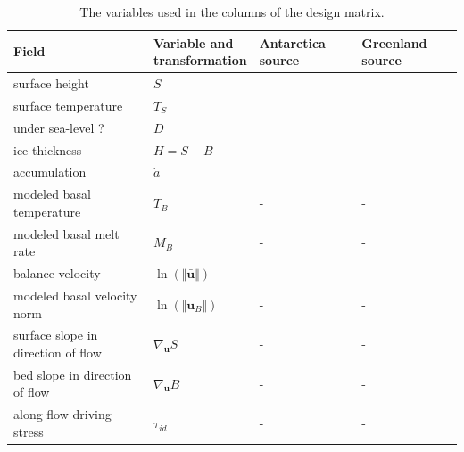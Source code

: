 \begin{table}[t]
\centering
\footnotesize
  \caption[Basal sliding statistical model variables]{The variables used in the columns of the design matrix.}
\begin{tabular}{l|l|l|l}
  \textbf{Field} & \specialcell{\textbf{Variable and}\\\textbf{transformation}} & \textbf{Antarctica source} & \textbf{Greenland source} \\
  \hline
  surface height                     & $S$                                                & \citep{fretwell_2013} & \citep{bamber_2013}               \\
  surface temperature                & $T_S$                                              & \citep{lebrocq_2010}  & \citep{fausto_2009}               \\
  under sea-level ?                  & $D$                                                & \citep{fretwell_2013} & \citep{bamber_2013}               \\
  ice thickness                      & $H = S - B$                                        & \citep{fretwell_2013} & \citep{bamber_2013}               \\
  accumulation                       & $\dot{a}$                                          & \citep{lebrocq_2010}  & \citep{burgess_2010,annoortvanvanderveen_2001} \\
  modeled basal temperature          & $T_B$                                              & -                 & -                             \\
  modeled basal melt rate            & $M_B$                                              & -                 & -                             \\
  balance velocity                   & $\ln\left(\Vert \bar{\mathbf{u}} \Vert \right)$    & -                 & -                             \\
  modeled basal velocity norm        & $\ln\left(\Vert \mathbf{u}_B \Vert \right)$        & -                 & -                             \\
  surface slope in direction of flow & $\nabla_{\mathbf{u}} S$                            & -                 & -                             \\
  bed slope in direction of flow     & $\nabla_{\mathbf{u}} B$                            & -                 & -                             \\
  along flow driving stress          & $\tau_{id}$                                        & -                 & -                             \\

\end{tabular}
\end{table}
